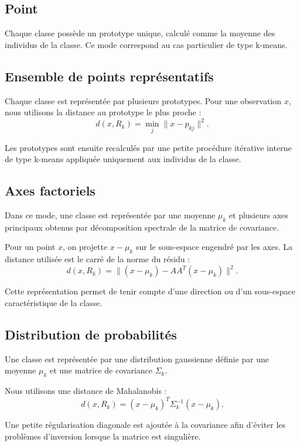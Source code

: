 \documentclass[12pt,a4paper]{article}
\begin{document}
\subsection{Point}

Chaque classe possède un prototype unique, calculé comme la moyenne des individus de la classe. Ce mode correspond au cas particulier de type k-means.

\subsection{Ensemble de points représentatifs}

Chaque classe est représentée par plusieurs prototypes. Pour une observation $x$, nous utilisons la distance au prototype le plus proche :
\[
d(x,R_k)=\min_j\|x-p_{kj}\|^2.
\]

Les prototypes sont ensuite recalculés par une petite procédure itérative interne de type k-means appliquée uniquement aux individus de la classe.

\subsection{Axes factoriels}

Dans ce mode, une classe est représentée par une moyenne $\mu_k$ et plusieurs axes principaux obtenus par décomposition spectrale de la matrice de covariance.

Pour un point $x$, on projette $x-\mu_k$ sur le sous-espace engendré par les axes. La distance utilisée est le carré de la norme du résidu :
\[
d(x,R_k)=\|(x-\mu_k)-AA^T(x-\mu_k)\|^2.
\]

Cette représentation permet de tenir compte d'une direction ou d'un sous-espace caractéristique de la classe.

\subsection{Distribution de probabilités}

Une classe est représentée par une distribution gaussienne définie par une moyenne $\mu_k$ et une matrice de covariance $\Sigma_k$.

Nous utilisons une distance de Mahalanobis :
\[
d(x,R_k)=(x-\mu_k)^T\Sigma_k^{-1}(x-\mu_k).
\]

Une petite régularisation diagonale est ajoutée à la covariance afin d'éviter les problèmes d'inversion lorsque la matrice est singulière.
\end{document}
